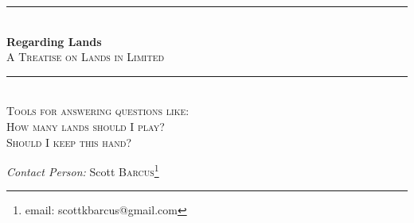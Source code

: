 \documentclass[oneside]{book}   %
\begin{document}
 
\frontmatter

\begin{titlepage} %
	\newcommand{\HRule}{\rule{\linewidth}{0.5mm}} %
	
	\center %
	

	
	\HRule\\[0.4cm]
	
	{\huge\bfseries Regarding Lands}\\[0.4cm] %
	\textsc{\Large A Treatise on Lands in Limited}
	\HRule\\[1.5cm]
	
	
	\textsc{\LARGE Tools for answering questions like:}\\[1.cm] %
	
	\textsc{\Large How many lands should I play?}\\[0.5cm] %
	
	\textsc{\Large Should I keep this hand?}\\[1.5cm] %
	
	\begin{minipage}{0.5\textwidth}
		\begin{center}
			\large
			\textit{Contact Person:}
			Scott \textsc{Barcus}\footnote{email: scottkbarcus@gmail.com} \newline
		\end{center}
	\end{minipage}
	
	
	
	

\end{titlepage}
\end{document}

